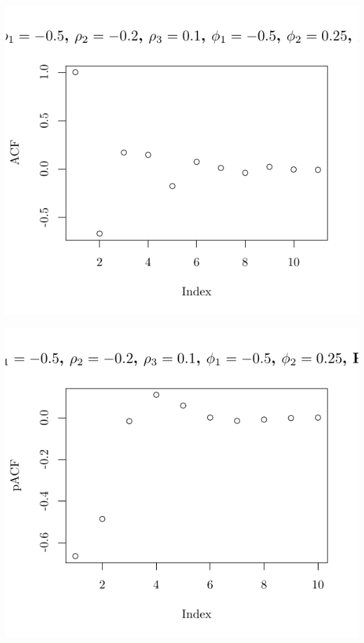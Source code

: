 \documentclass[10pt]{paper}\usepackage[]{graphicx}\usepackage[]{color}
\makeatletter
\def\maxwidth{ %
  \ifdim\Gin@nat@width>\linewidth
    \linewidth
  \else
    \Gin@nat@width
  \fi
}
\newenvironment{knitrout}{}{} %
\makeatother
\begin{document}
\begin{knitrout}
{\centering \includegraphics[width=\maxwidth]{figure/graphics-plotter-155} 

}




{\centering \includegraphics[width=\maxwidth]{figure/graphics-plotter-156} 

}





\end{knitrout}
\end{document}
